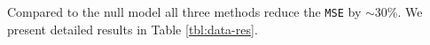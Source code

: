 \documentclass[preprint]{imsart}
\numberwithin{equation}{section}
\theoremstyle{plain}
\newcommand{\tr}[1]{{\textcolor{red}{#1}}}
\DeclareMathOperator*{\diag}{diag}
\begin{document}

Compared to the null model all three methods reduce the \verb|MSE| by $\sim 30\%$. We present detailed results in Table \ref{tbl:data-res}. %





\end{document}
